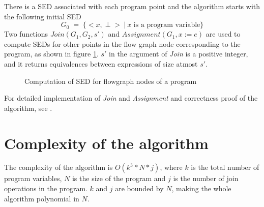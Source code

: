 There is a SED associated with each program point and the algorithm
starts with the following initial SED
$$G_0\; =\; \{<x,\perp>\: |\: x \text{ is a program variable}\}$$ 
Two functions $Join(G_1, G_2, s')$ and $Assignment(G_1, x := e)$ are 
used to compute SEDs for other points in the flow graph node 
corresponding to the program, as shown in figure 
\ref{fig:GulwaniAlgorithm}. $s'$ in the argument of \textit{Join} is 
a positive integer, and it returns equivalences between expressions of
size atmost $s'$.

\begin{figure}[!h]
    \caption{Computation of SED for flowgraph nodes of a program}
    \label{fig:GulwaniAlgorithm}
\end{figure}

For detailed implementation of \textit{Join} and \textit{Assignment} 
and correctness proof of the algorithm, see \cite{Gulwani}.

\section{Complexity of the algorithm}
The complexity of the algorithm is $O(k^{3} * N * j)$, where $k$ is  
the total number of program variables, $N$ is the size of the program 
and $j$ is the number of join operations in the program. $k$ and $j$ 
are bounded by $N$, making the whole algorithm polynomial in $N$.